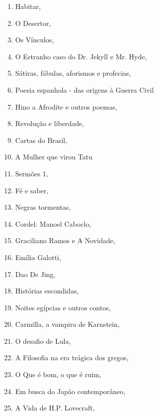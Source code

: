 \begin{multicols}{2}
\begin{enumerate}
\item Habitar, {}
\item O Desertor, {}
\item Os Vínculos, {}
\item O Estranho caso do Dr. Jekyll e Mr. Hyde, {}
\item Sátiras, fábulas, aforismos e profecias, {}
\item Poesia espanhola - das origens à Guerra Civil
\item Hino a Afrodite e outros poemas, {}
\item Revolução e liberdade, {}
\item Cartas do Brasil, {}
\item A Mulher que virou Tatu
\item Sermões 1, {}
\item Fé e saber, {}
\item Negras tormentas, {}
\item Cordel: Manoel Caboclo, {}
\item Graciliano Ramos e A Novidade, {}
\item Emília Galotti, {}
\item Dao De Jing, {}
\item Histórias escondidas, {}
\item Noites egípcias e outros contos, {}
\item Carmilla, a vampira de Karnstein, {}
\item O desafio de Lula, {}
\item A Filosofia na era trágica dos gregos, {}
\item O Que é bom, o que é ruim, {}
\item Em busca do Japão contemporâneo, {}
\item A Vida de H.P. Lovecraft, {}

\end{enumerate}
\end{multicols}
